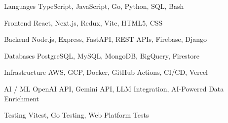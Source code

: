 

\begin{cvskills}

  \cvskill
    {Languages} %
    {TypeScript, JavaScript, Go, Python, SQL, Bash} %

  \cvskill
    {Frontend} %
    {React, Next.js, Redux, Vite, HTML5, CSS} %

  \cvskill
    {Backend} %
    {Node.js, Express, FastAPI, REST APIs, Firebase, Django} %

  \cvskill
    {Databases} %
    {PostgreSQL, MySQL, MongoDB, BigQuery, Firestore} %

  \cvskill
    {Infrastructure} %
    {AWS, GCP, Docker, GitHub Actions, CI/CD, Vercel} %

  \cvskill
    {AI / ML} %
    {OpenAI API, Gemini API, LLM Integration, AI-Powered Data Enrichment} %

  \cvskill
    {Testing} %
    {Vitest, Go Testing, Web Platform Tests} %

\end{cvskills}
